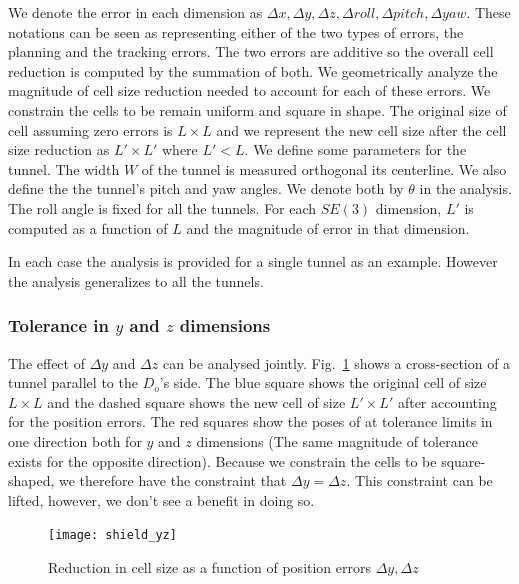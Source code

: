 \documentclass[a4paper]{report}
\begin{document}
We denote the error in each dimension as $\Delta x,\Delta y, \Delta z,\Delta roll,\Delta pitch,\Delta yaw$. These notations can be seen as representing either of the two types of errors, the planning and the tracking errors. The two errors are additive so the overall cell reduction is computed by the summation of both.
%
We geometrically analyze the magnitude of cell size reduction needed to account for each of these errors. We constrain the cells to be remain uniform and square in shape. The original size of cell assuming zero errors is $L \times L$ and we represent the new cell size after the cell size reduction as $L' \times L'$ where $L' < L$.
%
We define some parameters for the tunnel. The width $W$ of the tunnel is measured orthogonal its centerline. We also define the the tunnel's pitch and yaw angles. We denote both by $\theta$ in the analysis. The roll angle is fixed for all the tunnels.
%
For each $SE(3)$ dimension, $L'$ is computed as a function of $L$ and the magnitude of error in that dimension.

In each case the analysis is provided for a single tunnel as an example. However the analysis generalizes to all the tunnels.
%

\subsubsection{Tolerance in $y$ and $z$ dimensions}
The effect of $\Delta y$ and $\Delta z$ can be analysed jointly. Fig.~\ref{fig:shield_yz} shows a cross-section of a tunnel parallel to the $D_o$'s side. The blue square shows the original cell of size $L \times L$ and the dashed square shows the new cell of size $L' \times L'$ after accounting for the position errors. The red squares show the poses of \calS at tolerance limits in one direction both for $y$ and $z$ dimensions (The same magnitude of tolerance exists for the opposite direction). Because we constrain the cells to be square-shaped, we therefore have the constraint that $\Delta y = \Delta z$. This constraint can be lifted, however, we don't see a benefit in doing so.

\begin{figure}[ht]
\centering
\texttt{[image: shield\_yz]}
\caption{Reduction in cell size as a function of position errors $\Delta y, \Delta z$}
\label{fig:shield_yz}
\end{figure}
\end{document}
